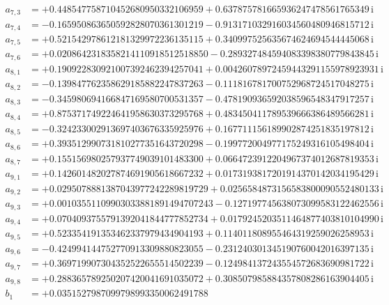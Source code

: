 {\begin{align*}
a_{7,3} &= +0.448547758710452680950332106959 + 0.637875781665936247478561765349\,\mathrm{i}\\
a_{7,4} &= -0.165950863650592828070361301219 - 0.913171032916034560480946815712\,\mathrm{i}\\
a_{7,5} &= +0.521542978612181329972236135115 + 0.340997525635674624694544445068\,\mathrm{i}\\
a_{7,6} &= +0.0208642318358214110918512518850 - 0.289327484594083398380779843845\,\mathrm{i}\\
a_{8,1} &= +0.190922830921007392462394257041 + 0.00426078972459443291155978923931\,\mathrm{i}\\
a_{8,2} &= -0.139847762358629185882247837263 - 0.111816781700752968724517048275\,\mathrm{i}\\
a_{8,3} &= -0.345980694166847169580700531357 - 0.478190936592038596548347917257\,\mathrm{i}\\
a_{8,4} &= +0.875371749224641958630373295768 + 0.483450411789539666386489566281\,\mathrm{i}\\
a_{8,5} &= -0.324233002913697403676335925976 + 0.167711156189902874251835197812\,\mathrm{i}\\
a_{8,6} &= +0.393512990731810277351643720298 - 0.199772004977175249316105498404\,\mathrm{i}\\
a_{8,7} &= +0.155156980257937749039101483300 + 0.0664723912204967374012687819353\,\mathrm{i}\\
a_{9,1} &= +0.142601482027874691905618667232 + 0.0173193817201914370142034195429\,\mathrm{i}\\
a_{9,2} &= +0.0295078881387043977242289819729 + 0.0256584873156583800090552480133\,\mathrm{i}\\
a_{9,3} &= +0.00103551109903033881891494707243 - 0.127197745638073099583122462556\,\mathrm{i}\\
a_{9,4} &= +0.0704093755791392041844777852734 + 0.0179245203511464877403810104990\,\mathrm{i}\\
a_{9,5} &= +0.523354191353462337979434904193 + 0.114011808955464319259026258953\,\mathrm{i}\\
a_{9,6} &= -0.424994144752770913309880823055 - 0.231240301345190760042016397135\,\mathrm{i}\\
a_{9,7} &= +0.369719907304352522655514502239 - 0.124984137243554572683690981722\,\mathrm{i}\\
a_{9,8} &= +0.288365789250207420041691035072 + 0.308507985884357808286163904405\,\mathrm{i}\\[1mm]
b_{1} &= +0.0351527987099798993350062491788\\

\end{align*}}
